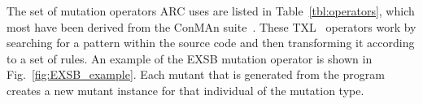 The set of mutation operators ARC uses are listed in Table~\ref{tbl:operators},
which most have been derived from the ConMAn suite~\cite{BCD06}. These
TXL~\cite{CHP91} operators work by searching for a pattern within the source
code and then transforming it according to a set of rules. An example of the
EXSB mutation operator is shown in Fig.~\ref{fig:EXSB_example}. Each mutant
that is generated from the program creates a new mutant instance for that
individual of the mutation type.


